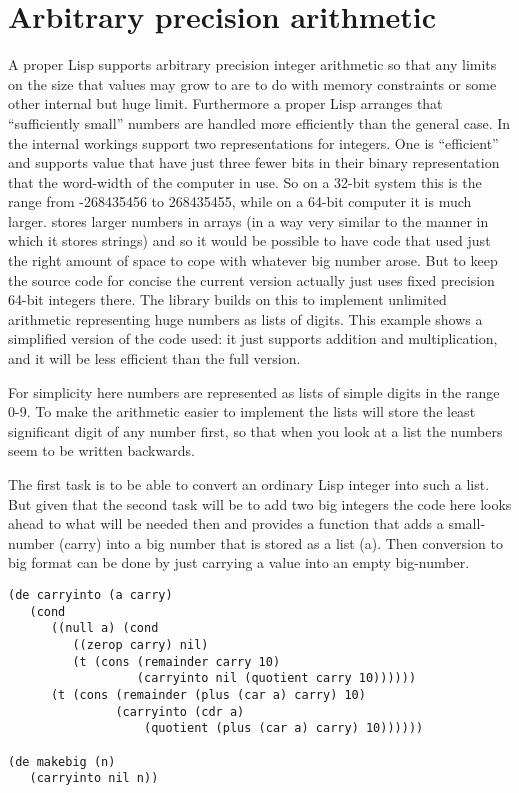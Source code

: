 \section{Arbitrary precision arithmetic}
A proper Lisp supports arbitrary precision integer arithmetic so that any limits
on the size that values may grow to are to do with memory constraints or
some other internal but huge limit. Furthermore a proper Lisp arranges that
``sufficiently small'' numbers are handled more efficiently than the general
case. In \vsl{} the internal workings support two representations for
integers. One is ``efficient'' and supports value that have just three
fewer bits in their binary representation that the word-width of the computer
in use. So on a 32-bit system this is the range from -268435456 to 268435455,
while on a 64-bit computer it is much larger. \vsl{} stores larger numbers
in arrays (in a way very similar to the manner in which it stores strings) and
so it would be possible to have code that used just the right amount of
space to cope with whatever big number arose. But to keep the source code for
\vsl{} concise the current version actually just uses fixed precision
64-bit integers there. The \vsl{} library builds on this to implement unlimited
arithmetic representing huge numbers as lists of digits. This example shows
a simplified version of the code used: it just supports addition and
multiplication, and it will be less efficient than the full version.
 
For simplicity here numbers are represented
as lists of simple digits in the range 0-9.
To make the arithmetic easier to implement the lists will store
the least significant digit of any number first, so that when you look
at a list the numbers seem to be written backwards.

The first task is to be able to convert an ordinary Lisp integer into
such a list. But given that the second task will be to add two big
integers the code here looks ahead to what will be needed then and
provides a function that adds a small-number ({\tx carry}) into a big
number that is stored as a list ({\tx a}).  Then conversion to big format can
be done by just carrying a value into an empty big-number.
{\small\begin{verbatim}
(de carryinto (a carry)
   (cond
      ((null a) (cond
         ((zerop carry) nil)
         (t (cons (remainder carry 10)
                  (carryinto nil (quotient carry 10))))))
      (t (cons (remainder (plus (car a) carry) 10)
               (carryinto (cdr a)
                   (quotient (plus (car a) carry) 10))))))

(de makebig (n)
   (carryinto nil n))
\end{verbatim}}

